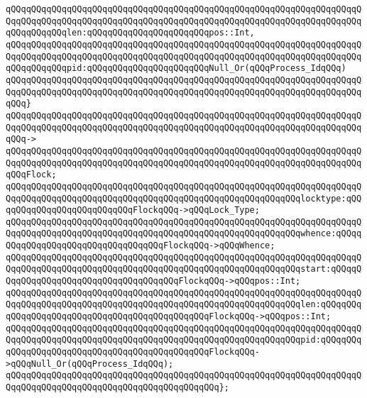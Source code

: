 \verb|qQQqqQQqqQQqqQQqqQQqqQQqqQQqqQQqqQQqqQQqqQQqqQQqqQQqqQQqqQQqqQQqqQQqqQQqqQQqqQQqqQQqqQQqqQQqqQQqqQQqqQQqqQQqqQQqqQQqqQQqqQQqqQQqqQQqqQQqqQQqqQQqqQQqqQQqlen:qQQqqQQqqQQqqQQqqQQqqQQqpos::Int,|\newline
\verb|qQQqqQQqqQQqqQQqqQQqqQQqqQQqqQQqqQQqqQQqqQQqqQQqqQQqqQQqqQQqqQQqqQQqqQQqqQQqqQQqqQQqqQQqqQQqqQQqqQQqqQQqqQQqqQQqqQQqqQQqqQQqqQQqqQQqqQQqqQQqqQQqqQQqqQQqpid:qQQqqQQqqQQqqQQqqQQqqQQqNull_Or(qQQqProcess_IdqQQq)|\newline
\verb|qQQqqQQqqQQqqQQqqQQqqQQqqQQqqQQqqQQqqQQqqQQqqQQqqQQqqQQqqQQqqQQqqQQqqQQqqQQqqQQqqQQqqQQqqQQqqQQqqQQqqQQqqQQqqQQqqQQqqQQqqQQqqQQqqQQqqQQqqQQqqQQq}|\newline
\verb|qQQqqQQqqQQqqQQqqQQqqQQqqQQqqQQqqQQqqQQqqQQqqQQqqQQqqQQqqQQqqQQqqQQqqQQqqQQqqQQqqQQqqQQqqQQqqQQqqQQqqQQqqQQqqQQqqQQqqQQqqQQqqQQqqQQqqQQqqQQqqQQq->|\newline
\verb|qQQqqQQqqQQqqQQqqQQqqQQqqQQqqQQqqQQqqQQqqQQqqQQqqQQqqQQqqQQqqQQqqQQqqQQqqQQqqQQqqQQqqQQqqQQqqQQqqQQqqQQqqQQqqQQqqQQqqQQqqQQqqQQqqQQqqQQqqQQqqQQqFlock;|\newline
\newline
\verb|qQQqqQQqqQQqqQQqqQQqqQQqqQQqqQQqqQQqqQQqqQQqqQQqqQQqqQQqqQQqqQQqqQQqqQQqqQQqqQQqqQQqqQQqqQQqqQQqqQQqqQQqqQQqqQQqqQQqqQQqqQQqqQQqlocktype:qQQqqQQqqQQqqQQqqQQqqQQqqQQqFlockqQQq->qQQqLock_Type;|\newline
\verb|qQQqqQQqqQQqqQQqqQQqqQQqqQQqqQQqqQQqqQQqqQQqqQQqqQQqqQQqqQQqqQQqqQQqqQQqqQQqqQQqqQQqqQQqqQQqqQQqqQQqqQQqqQQqqQQqqQQqqQQqqQQqqQQqwhence:qQQqqQQqqQQqqQQqqQQqqQQqqQQqqQQqqQQqFlockqQQq->qQQqWhence;|\newline
\verb|qQQqqQQqqQQqqQQqqQQqqQQqqQQqqQQqqQQqqQQqqQQqqQQqqQQqqQQqqQQqqQQqqQQqqQQqqQQqqQQqqQQqqQQqqQQqqQQqqQQqqQQqqQQqqQQqqQQqqQQqqQQqqQQqstart:qQQqqQQqqQQqqQQqqQQqqQQqqQQqqQQqqQQqqQQqFlockqQQq->qQQqpos::Int;|\newline
\verb|qQQqqQQqqQQqqQQqqQQqqQQqqQQqqQQqqQQqqQQqqQQqqQQqqQQqqQQqqQQqqQQqqQQqqQQqqQQqqQQqqQQqqQQqqQQqqQQqqQQqqQQqqQQqqQQqqQQqqQQqqQQqqQQqlen:qQQqqQQqqQQqqQQqqQQqqQQqqQQqqQQqqQQqqQQqqQQqqQQqFlockqQQq->qQQqpos::Int;|\newline
\verb|qQQqqQQqqQQqqQQqqQQqqQQqqQQqqQQqqQQqqQQqqQQqqQQqqQQqqQQqqQQqqQQqqQQqqQQqqQQqqQQqqQQqqQQqqQQqqQQqqQQqqQQqqQQqqQQqqQQqqQQqqQQqqQQqpid:qQQqqQQqqQQqqQQqqQQqqQQqqQQqqQQqqQQqqQQqqQQqqQQqFlockqQQq->qQQqNull_Or(qQQqProcess_IdqQQq);|\newline
\verb|qQQqqQQqqQQqqQQqqQQqqQQqqQQqqQQqqQQqqQQqqQQqqQQqqQQqqQQqqQQqqQQqqQQqqQQqqQQqqQQqqQQqqQQqqQQqqQQqqQQqqQQqqQQqqQQq};|\newline
